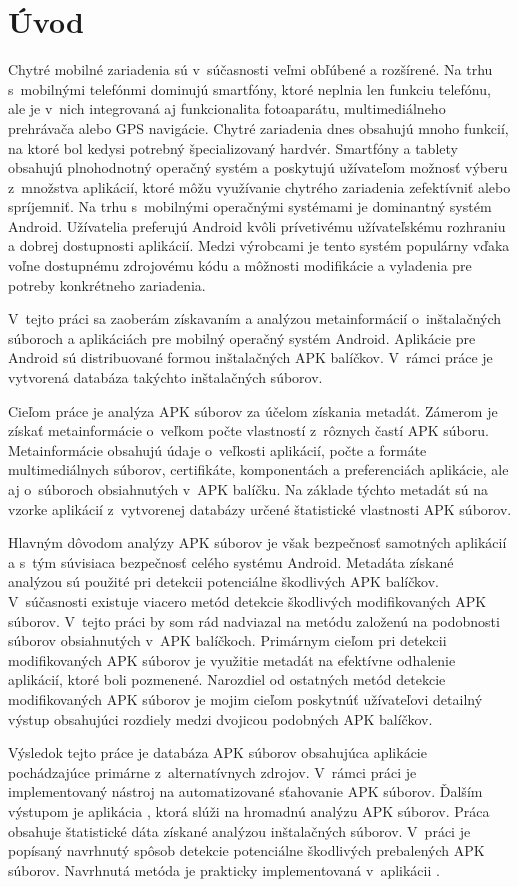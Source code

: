 \chapter{Úvod}
Chytré mobilné zariadenia sú v~súčasnosti veľmi obľúbené a rozšírené. Na trhu s~mobilnými telefónmi dominujú smartfóny, ktoré neplnia len funkciu telefónu, ale je v~nich integrovaná aj funkcionalita fotoaparátu, multimediálneho prehrávača alebo GPS navigácie. Chytré zariadenia dnes obsahujú mnoho funkcií, na ktoré bol kedysi potrebný špecializovaný hardvér. Smartfóny a tablety obsahujú plnohodnotný operačný systém a poskytujú užívateľom možnosť výberu z~množstva aplikácií, ktoré môžu využívanie chytrého zariadenia zefektívniť alebo spríjemniť. Na trhu s~mobilnými operačnými systémami je dominantný systém Android. Užívatelia preferujú Android kvôli prívetivému užívateľskému rozhraniu a dobrej dostupnosti aplikácií. Medzi výrobcami je tento systém populárny vďaka voľne dostupnému zdrojovému kódu a môžnosti modifikácie a vyladenia pre potreby konkrétneho zariadenia.

V~tejto práci sa zaoberám získavaním a analýzou metainformácií o~inštalačných súboroch a aplikáciách pre mobilný operačný systém Android. Aplikácie pre Android sú distribuované formou inštalačných APK balíčkov. V~rámci práce je vytvorená databáza takýchto inštalačných súborov. 

Cieľom práce je analýza APK súborov za účelom získania metadát. Zámerom je získať metainformácie o~veľkom počte vlastností z~rôznych častí APK súboru. Metainformácie obsahujú údaje o~veľkosti aplikácií, počte a formáte multimediálnych súborov, certifikáte, komponentách a preferenciách aplikácie, ale aj o~súboroch obsiahnutých v~APK balíčku. Na základe týchto metadát sú na vzorke aplikácií z~vytvorenej databázy určené štatistické vlastnosti APK súborov. 

Hlavným dôvodom analýzy APK súborov je však bezpečnosť samotných aplikácií a s~tým súvisiaca bezpečnosť celého systému Android. Metadáta získané analýzou sú použité pri detekcii potenciálne škodlivých APK balíčkov.
V~súčasnosti existuje viacero metód detekcie škodlivých modifikovaných APK  súborov. V~tejto práci by som rád nadviazal na metódu založenú na podobnosti súborov obsiahnutých v~APK balíčkoch.
Primárnym cieľom pri detekcii modifikovaných APK súborov je využitie metadát na efektívne odhalenie aplikácií, ktoré boli pozmenené. Narozdiel od ostatných metód detekcie modifikovaných APK súborov je mojim cieľom poskytnúť užívateľovi detailný výstup obsahujúci rozdiely medzi dvojicou podobných APK balíčkov.

Výsledok tejto práce je databáza APK súborov obsahujúca aplikácie pochádzajúce primárne z~alternatívnych zdrojov. V~rámci práci je implementovaný nástroj na automatizované sťahovanie APK súborov. Ďalším výstupom je aplikácia , ktorá slúži na hromadnú analýzu APK súborov. Práca obsahuje štatistické dáta získané analýzou inštalačných súborov. V~práci je popísaný navrhnutý spôsob detekcie potenciálne škodlivých prebalených APK súborov. Navrhnutá metóda je prakticky implementovaná v~aplikácii .